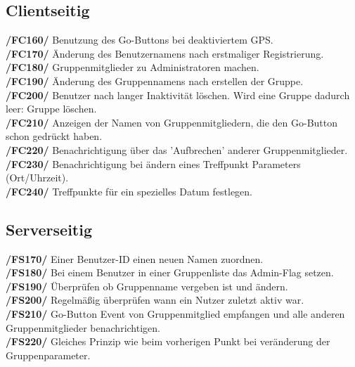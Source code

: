 \subsection{Clientseitig}
     \textbf{/FC160/} Benutzung des Go-Buttons bei deaktiviertem GPS.\\
     \textbf{/FC170/} Änderung des Benutzernamens nach erstmaliger Registrierung.\\
     \textbf{/FC180/} Gruppenmitglieder zu Administratoren machen.\\
     \textbf{/FC190/} Änderung des Gruppennamens nach erstellen der Gruppe.\\
     \textbf{/FC200/} Benutzer nach langer Inaktivität löschen. Wird eine Gruppe dadurch leer: Gruppe löschen.\\
     \textbf{/FC210/} Anzeigen der Namen von Gruppenmitgliedern, die den Go-Button schon gedrückt haben.\\
     \textbf{/FC220/} Benachrichtigung über das 'Aufbrechen' anderer Gruppenmitglieder.\\
     \textbf{/FC230/} Benachrichtigung bei ändern eines Treffpunkt Parameters (Ort/Uhrzeit).\\
     \textbf{/FC240/} Treffpunkte für ein spezielles Datum festlegen.\\
\subsection{Serverseitig}
     \textbf{/FS170/} Einer Benutzer-ID einen neuen Namen zuordnen.\\
     \textbf{/FS180/} Bei einem Benutzer in einer Gruppenliste das Admin-Flag setzen.\\
     \textbf{/FS190/} Überprüfen ob Gruppenname vergeben ist und ändern.\\
     \textbf{/FS200/} Regelmäßig überprüfen wann ein Nutzer zuletzt aktiv war.\\
     \textbf{/FS210/} Go-Button Event von Gruppenmitglied empfangen und alle anderen Gruppenmitglieder benachrichtigen.\\
     \textbf{/FS220/} Gleiches Prinzip wie beim vorherigen Punkt bei veränderung der Gruppenparameter.\\
